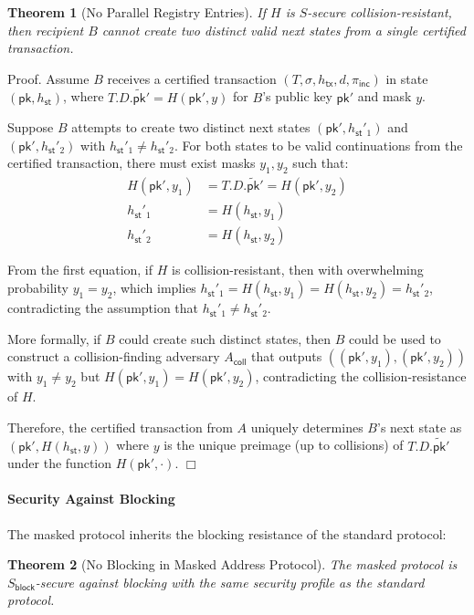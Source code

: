 \documentclass{article}
\newtheorem{theorem}{Theorem}[section]
\newenvironment{proof}{\textsf{Proof}.}{\hfill$\Box$}
\newcommand{\pubkey}[0]{\mathsf{pk}}
\newcommand{\mpubkey}{\widetilde{\pubkey}}
\newcommand{\sthash}[0]{{h_\mathsf{st}}}
\newcommand{\txhash}[0]{{h_\mathsf{tx}}}
\newcommand{\pinc}[0]{{\pi_{\mathsf{inc}}}}
\begin{document}
\begin{theorem}[No Parallel Registry Entries]
If $H$ is $S$-secure collision-resistant, then recipient $B$ cannot create two distinct valid next states from a single certified transaction.
\end{theorem}

\begin{proof}
Assume $B$ receives a certified transaction $(T, \sigma, \txhash, d, \pinc)$ in state $(\pubkey, \sthash)$, where $T.D.\mpubkey' = H(\pubkey', y)$ for $B$'s public key $\pubkey'$ and mask $y$.

Suppose $B$ attempts to create two distinct next states $(\pubkey', \sthash'_1)$ and $(\pubkey', \sthash'_2)$ with $\sthash'_1 \neq \sthash'_2$. For both states to be valid continuations from the certified transaction, there must exist masks $y_1, y_2$ such that:
\begin{align*}
H(\pubkey', y_1) &= T.D.\mpubkey' = H(\pubkey', y_2) \\
\sthash'_1 &= H(\sthash, y_1) \\
\sthash'_2 &= H(\sthash, y_2)
\end{align*}

From the first equation, if $H$ is collision-resistant, then with overwhelming probability $y_1 = y_2$, which implies $\sthash'_1 = H(\sthash, y_1) = H(\sthash, y_2) = \sthash'_2$, contradicting the assumption that $\sthash'_1 \neq \sthash'_2$.

More formally, if $B$ could create such distinct states, then $B$ could be used to construct a collision-finding adversary $A_{\mathsf{coll}}$ that outputs $((\pubkey', y_1), (\pubkey', y_2))$ with $y_1 \neq y_2$ but $H(\pubkey', y_1) = H(\pubkey', y_2)$, contradicting the collision-resistance of $H$.

Therefore, the certified transaction from $A$ uniquely determines $B$'s next state as $(\pubkey', H(\sthash, y))$ where $y$ is the unique preimage (up to collisions) of $T.D.\mpubkey'$ under the function $H(\pubkey', \cdot)$.
\end{proof}

\paragraph{Security Against Blocking}

The masked protocol inherits the blocking resistance of the standard protocol:

\begin{theorem}[No Blocking in Masked Address Protocol]
The masked protocol is $S_{\mathsf{block}}$-secure against blocking with the same security profile as the standard protocol.
\end{theorem}
\end{document}
